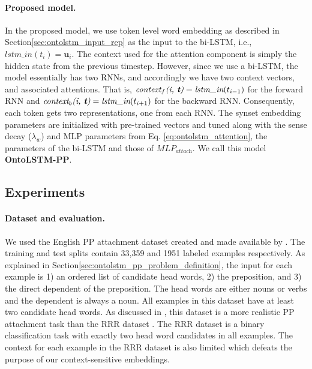 \paragraph{Proposed model.}
\label{sec:ontolstm_proposed_ppa_model}
In the proposed model, we use token level word embedding as described in Section\ref{sec:ontolstm_input_rep} as the input to the bi-LSTM, i.e., $\textit{lstm\_in}(t_i) = \mathbf{u}_i$. The context used for the attention component is simply the hidden state from the previous timestep. However, since we use a bi-LSTM, the model essentially has two RNNs, and accordingly we have two context vectors, and associated attentions. That is, $\textit{context}_f\textit{(i, \textbf{t})} = \textit{lstm\_in}(t_{i-1})$ for the forward RNN and $\textit{context}_b\textit{(i, \textbf{t})} = \textit{lstm\_in}(t_{i+1})$ for the backward RNN. Consequently, each token gets two representations, one from each RNN. The synset embedding parameters are initialized with pre-trained vectors and tuned along with the sense decay ($\lambda_{w}$) and MLP parameters from Eq. \ref{eq:ontolstm_attention}, the parameters of the bi-LSTM and those of $\textit{MLP}_{\textit{attach}}$. We call this model \textbf{OntoLSTM-PP}.

\subsection{Experiments}
\label{sec:ontolstm_pp_experiments} 

\paragraph{Dataset and evaluation.} We used the English PP attachment dataset created and made available by \cite{belinkov2014exploring}. The training and test splits contain 33,359 and 1951 labeled examples respectively. As explained in Section\ref{sec:ontolstm_pp_problem_definition}, the input for each example is 1) an ordered list of candidate head words, 2) the preposition, and 3) the direct dependent of the preposition.
The head words are either nouns or verbs and the dependent is always a noun. 
All examples in this dataset have at least two candidate head words.
As discussed in \cite{belinkov2014exploring}, this dataset is a more realistic PP attachment task than the RRR dataset \citep{ratnaparkhi1994maximum}.
The RRR dataset is a binary classification task with exactly two head word candidates in all examples.
The context for each example in the RRR dataset is also limited which defeats the purpose of our context-sensitive embeddings.

